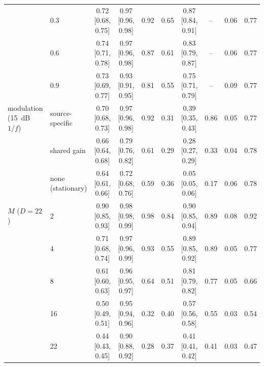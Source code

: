 \begin{table}[h]
\begin{tabular}{llcccccccc}
 & 0.3 & 0.72 [0.68, 0.75] & 0.97 [0.96, 0.98] & 0.92 & 0.65 & 0.87 [0.84, 0.91] & -- & 0.06 & 0.77 \\
 & 0.6 & 0.74 [0.71, 0.78] & 0.97 [0.96, 0.98] & 0.87 & 0.61 & 0.83 [0.79, 0.87] & -- & 0.06 & 0.77 \\
 & 0.9 & 0.73 [0.69, 0.77] & 0.93 [0.91, 0.95] & 0.81 & 0.55 & 0.75 [0.71, 0.79] & -- & 0.09 & 0.77 \\
\midrule
modulation (15~dB $1/f$) & source-specific & 0.70 [0.68, 0.73] & 0.97 [0.96, 0.98] & 0.92 & 0.31 & 0.39 [0.35, 0.43] & 0.86 & 0.05 & 0.77 \\
 & shared gain & 0.66 [0.64, 0.68] & 0.79 [0.76, 0.82] & 0.61 & 0.29 & 0.28 [0.27, 0.29] & 0.33 & 0.04 & 0.78 \\
 & none (stationary) & 0.64 [0.61, 0.66] & 0.72 [0.68, 0.76] & 0.59 & 0.36 & 0.05 [0.05, 0.06] & 0.17 & 0.06 & 0.78 \\
\midrule
$M$ ($D = 22$) & 2 & 0.90 [0.85, 0.93] & 0.98 [0.98, 0.99] & 0.98 & 0.84 & 0.90 [0.85, 0.94] & 0.89 & 0.08 & 0.92 \\
 & 4 & 0.71 [0.68, 0.74] & 0.97 [0.96, 0.99] & 0.93 & 0.55 & 0.89 [0.85, 0.92] & 0.89 & 0.05 & 0.77 \\
 & 8 & 0.61 [0.60, 0.63] & 0.96 [0.95, 0.97] & 0.64 & 0.51 & 0.81 [0.79, 0.82] & 0.77 & 0.05 & 0.66 \\
 & 16 & 0.50 [0.49, 0.51] & 0.95 [0.94, 0.96] & 0.32 & 0.40 & 0.57 [0.56, 0.58] & 0.55 & 0.03 & 0.54 \\
 & 22 & 0.44 [0.43, 0.45] & 0.90 [0.88, 0.92] & 0.28 & 0.37 & 0.41 [0.41, 0.42] & 0.41 & 0.03 & 0.47 \\
\bottomrule
\end{tabular}
\end{table}

